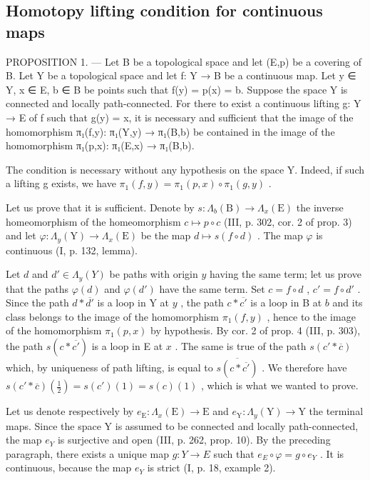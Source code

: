\subsection{Homotopy lifting condition for continuous maps}

PROPOSITION 1. --- Let B be a topological space and let (E,p) be a covering of B. Let Y be a topological space and let f: Y → B be a continuous map. Let y ∈ Y, x ∈ E, b ∈ B be points such that f(y) = p(x) = b. Suppose the space Y is connected and locally path-connected. For there to exist a continuous lifting g: Y → E of f such that g(y) = x, it is necessary and sufficient that the image of the homomorphism π₁(f,y): π₁(Y,y) → π₁(B,b) be contained in the image of the homomorphism π₁(p,x): π₁(E,x) → π₁(B,b).

The condition is necessary without any hypothesis on the space Y. Indeed, if such a lifting g exists, we have \(\pi_{1}(f,y)=\pi_{1}(p,x)\circ\pi_{1}(g,y)\) .

Let us prove that it is sufficient. Denote by \(s\colon \Lambda_{b}(\mathrm{B})\to \Lambda_{x}(\mathrm{E})\) the inverse homeomorphism of the homeomorphism \(c\mapsto p\circ c\) (III, p. 302, cor. 2 of prop. 3) and let \(\varphi \colon \Lambda_y(\mathrm{Y})\to \Lambda_x(\mathrm{E})\) be the map \(d\mapsto s(f\circ d)\) . The map \(\varphi\) is continuous (I, p. 132, lemma).

Let \(d\) and \(d' \in \Lambda_y(Y)\) be paths with origin \(y\) having the same term; let us prove that the paths \(\varphi(d)\) and \(\varphi(d')\) have the same term. Set \(c = f \circ d\) , \(c' = f \circ d'\) . Since the path \(d * \overline{d'}\) is a loop in Y at \(y\) , the path \(c * \overline{c'}\) is a loop in B at \(b\) and its class belongs to the image of the homomorphism \(\pi_1(f, y)\) , hence to the image of the homomorphism \(\pi_1(p, x)\) by hypothesis. By cor. 2 of prop. 4 (III, p. 303), the path \(s(c * \overline{c'})\) is a loop in E at \(x\) . The same is true of the path \(s(c' * \overline{c})\) which, by uniqueness of path lifting, is equal to \(\overline{s(c * \overline{c'})}\) . We therefore have \(s(c' * \overline{c})(\frac{1}{2}) = s(c')(1) = s(c)(1)\) , which is what we wanted to prove.

Let us denote respectively by \(e_{\mathrm{E}}\colon\Lambda_{x}(\mathrm{E})\to\mathrm{E}\) and \(e_{\mathrm{Y}}\colon\Lambda_{y}(\mathrm{Y})\to\mathrm{Y}\) the terminal maps. Since the space Y is assumed to be connected and locally path-connected, the map \(e_{Y}\) is surjective and open (III, p. 262, prop. 10). By the preceding paragraph, there exists a unique map \(g\colon Y\to E\) such that \(e_{E}\circ\varphi=g\circ e_{Y}\) . It is continuous, because the map \(e_{Y}\) is strict (I, p. 18, example 2).

